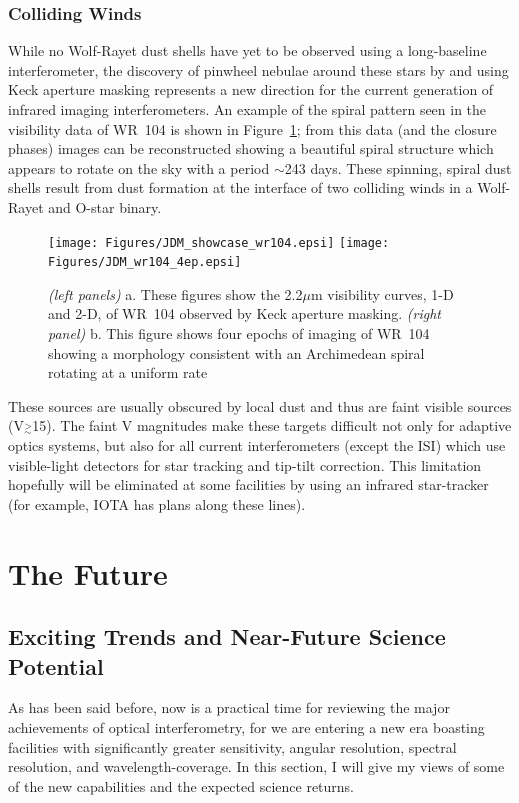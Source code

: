 \documentclass[12pt]{iopart}
\newcommand{\simge}{\mbox{$\stackrel{>}{_{\sim}}$}}
\begin{document}
\subsubsection{Colliding Winds}
While no Wolf-Rayet dust shells have yet to be observed using a
long-baseline interferometer, the discovery of pinwheel nebulae around
these stars by \citet{tuthill1999b} and \citet{monnier1999} using Keck
aperture masking represents a new direction for the current generation
of infrared imaging interferometers.  An example of the spiral pattern
seen in the visibility data of WR~104 is shown in
Figure~\ref{wr104fig}; from this data (and the closure phases) images
can be reconstructed showing a beautiful spiral structure which
appears to rotate on the sky with a period $\sim$243 days.  These
spinning, spiral dust shells result from dust formation at the
interface of two colliding winds in a Wolf-Rayet and O-star binary.

\begin{figure}
\begin{center}
 \texttt{[image: Figures/JDM\_showcase\_wr104.epsi]}
  \texttt{[image: Figures/JDM\_wr104\_4ep.epsi]}
\caption{
  \footnotesize {\em (left panels)} a. These figures show the
  2.2$\mu$m visibility curves, 1-D and 2-D, of WR~104 observed by Keck
  aperture masking.  {\em (right panel)} b. This figure shows four
  epochs of imaging of WR~104 showing a morphology consistent with an
  Archimedean spiral rotating at a uniform rate \citep[from][Figure
  13.6]{monnier99}
\label{wr104fig}}
\end{center}
\end{figure}

These sources are usually  obscured by local dust and thus are
faint visible sources (V$\simge$15). The faint V magnitudes make these
targets difficult not only for adaptive optics systems, but also for
all current interferometers (except the ISI) which use visible-light
detectors for star tracking and tip-tilt correction.  This limitation
hopefully will be eliminated at some facilities by using an infrared
star-tracker (for example, IOTA has plans along these lines).

\section{The Future}
\label{future}
\subsection{Exciting Trends and Near-Future Science Potential}
As has been said before, now is a practical time for reviewing the
major achievements of optical interferometry, for we are entering a
new era boasting facilities with significantly greater
sensitivity, angular resolution, spectral resolution, and
wavelength-coverage.  In this section, I will give my views of some of
the new capabilities and the expected science returns.
\end{document}
